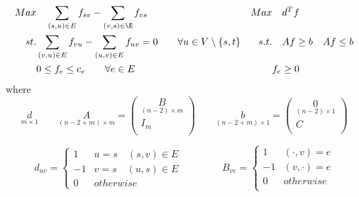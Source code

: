 \documentclass[11pt]{article}
\begin{document}
\begin{align*}
    Max &\quad \sum_{(s,u)\in E} f_{sv} - \sum_{(v,s)\in\E} f_{vs} 
    & 
    Max &\quad d^T f \\
    st. &\sum_{(v,u)\in E} f_{vu} - \sum_{(u,v) \in E} f_{uv} = 0 \qquad \forall u\in V \setminus \{s,t\} 
    & 
    s.t. &\quad Af \geq b \quad Af \leq b \\
    &0 \leq f_e \leq c_e \qquad \forall e\in E 
    & 
    & f_e \geq 0
    \\
\end{align*}
where
\[
    \underset{m\times 1}{d} 
    \qquad 
    \underset{(n-2+m)\times m}{A} = 
    \begin{pmatrix}
        \underset{(n-2)\times m}{B} \\
        I_m \\ 
    \end{pmatrix} 
    \qquad 
    \underset{(n-2+m)\times 1}{b} = 
    \begin{pmatrix}
        \underset{(n-2)\times 1}{0} \\
        C \\ 
    \end{pmatrix}
\]


\[
    d_{uv} = 
    \begin{cases}
        1  & u = s \quad (s,v)\in E  \\ 
        -1 & v = s \quad (u,s)\in E  \\ 
        0 & otherwise
    \end{cases}  
    \qquad 
    \qquad 
    B_{ve} = 
    \begin{cases}
        1 & (\cdot , v) = e \\
        -1 & (v, \cdot ) = e \\ 
        0 & otherwise \\
    \end{cases}    
\]
\end{document}
